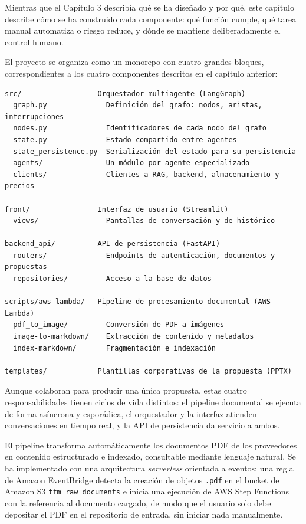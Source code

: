 \clearpage
{}

Mientras que el Capítulo 3 describía qué se ha diseñado y por qué, este capítulo describe cómo se ha construido cada componente: qué función cumple, qué tarea manual automatiza o riesgo reduce, y dónde se mantiene deliberadamente el control humano.

El proyecto se organiza como un monorepo con cuatro grandes bloques, correspondientes a los cuatro componentes descritos en el capítulo anterior:

\begin{verbatim}
src/                  Orquestador multiagente (LangGraph)
  graph.py              Definición del grafo: nodos, aristas, interrupciones
  nodes.py              Identificadores de cada nodo del grafo
  state.py              Estado compartido entre agentes
  state_persistence.py  Serialización del estado para su persistencia
  agents/               Un módulo por agente especializado
  clients/              Clientes a RAG, backend, almacenamiento y precios

front/                Interfaz de usuario (Streamlit)
  views/                Pantallas de conversación y de histórico

backend_api/          API de persistencia (FastAPI)
  routers/              Endpoints de autenticación, documentos y propuestas
  repositories/         Acceso a la base de datos

scripts/aws-lambda/   Pipeline de procesamiento documental (AWS Lambda)
  pdf_to_image/         Conversión de PDF a imágenes
  image-to-markdown/    Extracción de contenido y metadatos
  index-markdown/       Fragmentación e indexación

templates/            Plantillas corporativas de la propuesta (PPTX)
\end{verbatim}

Aunque colaboran para producir una única propuesta, estas cuatro responsabilidades tienen ciclos de vida distintos: el pipeline documental se ejecuta de forma asíncrona y esporádica, el orquestador y la interfaz atienden conversaciones en tiempo real, y la API de persistencia da servicio a ambos.


El pipeline transforma automáticamente los documentos PDF de los proveedores en
contenido estructurado e indexado, consultable mediante lenguaje natural. Se ha
implementado con una arquitectura \textit{serverless} orientada a eventos: una regla de
Amazon EventBridge detecta la creación de objetos \texttt{.pdf} en el bucket de Amazon S3
\texttt{tfm\_raw\_documents} e inicia una ejecución de AWS Step Functions con la
referencia al documento cargado, de modo que el usuario solo debe depositar el PDF en
el repositorio de entrada, sin iniciar nada manualmente.

